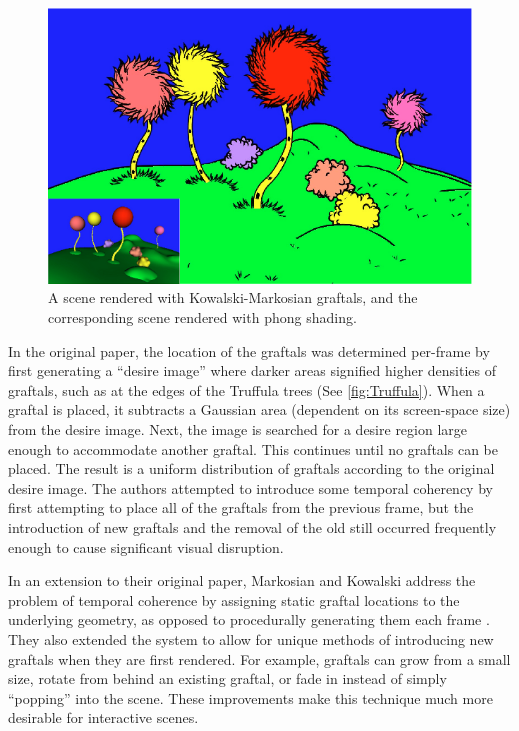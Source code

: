 \documentclass[notitlepage]{report}
\begin{document}
\begin{figure}[t]
\centering
\includegraphics[width=1.0\textwidth]{img/Truffula}
\caption{A scene rendered with Kowalski-Markosian graftals, and the corresponding scene rendered with phong shading. }
\label{fig:Truffula}
\end{figure}

In the original paper, the location of the graftals was determined per-frame by first generating a “desire image” where darker areas signified higher densities of graftals, such as at the edges of the Truffula trees (See \autoref{fig:Truffula}). When a graftal is placed, it subtracts a Gaussian area (dependent on its screen-space size) from the desire image. Next, the image is searched for a desire region large enough to accommodate another graftal. This continues until no graftals can be placed. The result is a uniform distribution of graftals according to the original desire image. The authors attempted to introduce some temporal coherency by first attempting to place all of the graftals from the previous frame, but the introduction of new graftals and the removal of the old still occurred frequently enough to cause significant visual disruption.

In an extension to  their original paper, Markosian and Kowalski address the problem of temporal coherence by assigning static graftal locations to the underlying geometry, as opposed to procedurally generating them each frame \cite{Markosian2000}. They also extended the system to allow for unique methods of introducing new graftals when they are first rendered. For example, graftals can grow from a small size, rotate from behind an existing graftal, or fade in instead of simply “popping” into the scene. These improvements make this technique much more desirable for interactive scenes.
\end{document}
